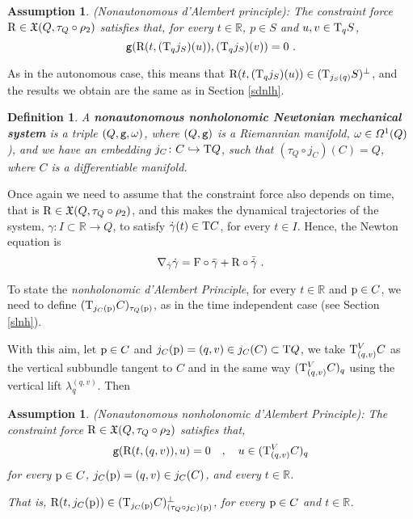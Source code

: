 \documentclass[12pt]{report}
\newtheorem{definition}[teor]{Definition}
\newtheorem{assump}[teor]{Assumption}
\def\vf{\mathfrak X}
\def\df{{\mit\Omega}}
\def\Real{\mathbb{R}}
\def\Tan{{\rm T}}
\begin{document}
\begin{assump}
{\rm (Nonautonomous d'Alembert principle)}:
The constraint force ${\rm R}\in\vf (Q,\tau_Q\circ\rho_2)$ satisfies that,
for every $t\in\Real$, $p\in S$ and $u,v\in\Tan_qS$,
$$
{\tt g}({\rm R}(t,(\Tan_qj_S)(u)),(\Tan_qj_S)(v))=0 \ .
$$
\end{assump}

As in the autonomous case, this means that 
${\rm R}(t,(\Tan_qj_S)(u))\in(\Tan_{j_S(q)}S)^\perp$, and the results we obtain are the same as in Section \ref{sdnlh}.

\begin{definition}
A {\sl \textbf{nonautonomous nonholonomic Newtonian mechanical system}}
is a triple $(Q,{\tt g},\omega)$, where $(Q,{\tt g})$ is a Riemannian manifold, $\omega\in\df^1(Q)$),
and we have an embedding 
$j_C\colon C\hookrightarrow \Tan Q$, such that $(\tau_Q\circ j_C)(C)=Q$,
 where $C$ is a differentiable manifold.
\end{definition}

Once again we need to assume that the constraint force also depends on time, that is ${\rm R}\in\vf (Q,\tau_Q\circ\rho_2)$, and this makes the dynamical trajectories of the system, 
$\gamma\colon I\subset\Real\to Q$, to satisfy
$\dot\gamma(t)\in\Tan C$,  for every $t\in I$.
Hence, the Newton equation is 
$$
\nabla_{\dot\gamma}\dot\gamma ={\rm F}\circ\bar\gamma +{\rm R}\circ\bar{\dot\gamma} \ .
$$

To state the \textsl{nonholonomic d'Alembert Principle}, for every $t\in\Real$
and ${\rm p}\in C$, we need to define $(\Tan_{j_C({\rm p})}C)_{\tau_
Q({\rm p})}$,
as in the time independent case (see Section \ref{slnh}).

With this aim, let ${\rm p}\in C$ and $j_C({\rm p})=(q,v)\in j_C(C)\subset\Tan Q$, we take $\Tan^V_{(q,v)}C$ as the vertical subbundle tangent to $C$ and in the same way  $(\Tan^V_{(q,v)}C)_q$ using the vertical lift $\lambda_{q}^{(q,v)}$. Then

\begin{assump}
{\rm (Nonautonomous nonholonomic d'Alembert Principle)}:
The constraint force ${\rm R}\in\vf (Q,\tau_Q\circ\rho_2)$ satisfies that,
$$
{\tt g}({\rm R}(t,(q,v)),u)=0 \quad , \quad u\in(\Tan^V_{(q,v)}C)_q
$$
for every  ${\rm p}\in C$, $j_C({\rm p})=(q,v)\in j_C(C)$, and every $t\in\Real$. 

That is,
${\rm R}(t,j_C({\rm p}))\in(\Tan_{j_C({\rm p})}C)_{(\tau_Q \circ j_C)({\rm p})}^\perp $,
for every ${\rm p}\in C$ and $t\in\Real$.
\end{assump}
\end{document}
